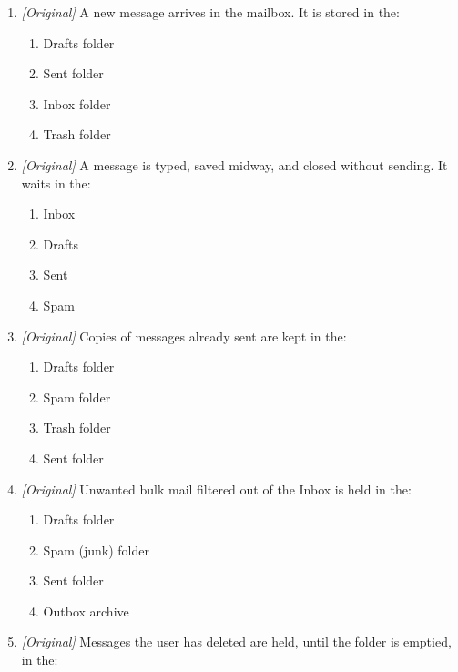 \begin{enumerate}[label=\textbf{Q\arabic*.}, leftmargin=*]
\begin{enumerate}[label=\Alph*.]
    \item Bcc recipients are hidden from each other, while To and Cc addresses remain visible to all.
    \item Bcc hides the sender's address from every recipient.
    \item Bcc hides the To and Cc lists from everyone who receives the message.
    \item Bcc recipients do not receive the message; they only receive a notification.
  \end{enumerate}
\item \textit{[Original]} A new message arrives in the mailbox. It is stored in the:
  \begin{enumerate}[label=\Alph*.]
    \item Drafts folder
    \item Sent folder
    \item Inbox folder
    \item Trash folder
  \end{enumerate}
\item \textit{[Original]} A message is typed, saved midway, and closed without sending. It waits in the:
  \begin{enumerate}[label=\Alph*.]
    \item Inbox
    \item Drafts
    \item Sent
    \item Spam
  \end{enumerate}
\item \textit{[Original]} Copies of messages already sent are kept in the:
  \begin{enumerate}[label=\Alph*.]
    \item Drafts folder
    \item Spam folder
    \item Trash folder
    \item Sent folder
  \end{enumerate}
\item \textit{[Original]} Unwanted bulk mail filtered out of the Inbox is held in the:
  \begin{enumerate}[label=\Alph*.]
    \item Drafts folder
    \item Spam (junk) folder
    \item Sent folder
    \item Outbox archive
  \end{enumerate}
\item \textit{[Original]} Messages the user has deleted are held, until the folder is emptied, in the:

\end{enumerate}
